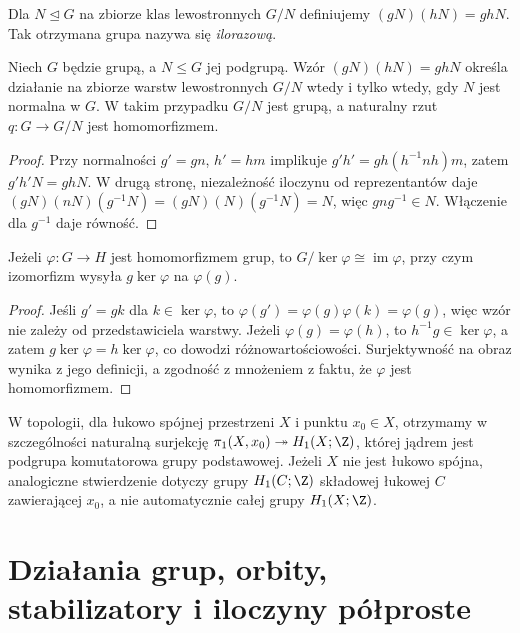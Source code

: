 \begin{definicja}
Dla $N\trianglelefteq G$ na zbiorze klas lewostronnych $G/N$ definiujemy
$(gN)(hN)=ghN$. Tak otrzymana grupa nazywa się \emph{ilorazową}.
\end{definicja}
\begin{lemat}
Niech $G$ będzie grupą, a $N\leq G$ jej podgrupą.
Wzór $(gN)(hN)=ghN$ określa działanie na zbiorze
warstw lewostronnych $G/N$ wtedy i tylko wtedy, gdy
$N$ jest normalna w $G$. W takim przypadku $G/N$
jest grupą, a naturalny rzut $q:G\to G/N$ jest
homomorfizmem.
\end{lemat}
\begin{proof}
Przy normalności $g'=gn$, $h'=hm$ implikuje
$g'h'=gh(h^{-1}nh)m$, zatem $g'h'N=ghN$. W drugą stronę,
niezależność iloczynu od reprezentantów daje
$(gN)(nN)(g^{-1}N)=(gN)(N)(g^{-1}N)=N$,
więc $gng^{-1}\in N$. Włączenie dla $g^{-1}$ daje równość.
\end{proof}
\begin{twierdzenie}
\label{thm:izo-grupy-v5}
Jeżeli $\varphi:G\to H$ jest homomorfizmem grup, to
$G/\ker\varphi\cong\operatorname{im}\varphi$, przy czym izomorfizm
wysyła $g\ker\varphi$ na $\varphi(g)$.
\end{twierdzenie}
\begin{proof}
Jeśli $g'=gk$ dla $k\in\ker\varphi$, to
$\varphi(g')=\varphi(g)\varphi(k)=\varphi(g)$,
więc wzór nie zależy od przedstawiciela warstwy.
Jeżeli $\varphi(g)=\varphi(h)$, to
$h^{-1}g\in\ker\varphi$, a zatem
$g\ker\varphi=h\ker\varphi$, co dowodzi różnowartościowości.
Surjektywność na obraz wynika z jego definicji, a zgodność
z mnożeniem z faktu, że $\varphi$ jest homomorfizmem.
\end{proof}
\begin{uwaga}
W topologii, dla łukowo spójnej przestrzeni $X$ i punktu
$x_0\in X$, otrzymamy w szczególności naturalną surjekcję
$\pi_1(X,x_0)\twoheadrightarrow H_1(X;\Z)$, której jądrem jest
podgrupa komutatorowa grupy podstawowej. Jeżeli $X$ nie jest łukowo
spójna, analogiczne stwierdzenie dotyczy grupy $H_1(C;\Z)$
składowej łukowej $C$ zawierającej $x_0$, a nie automatycznie
całej grupy $H_1(X;\Z)$.
\end{uwaga}

\section{Działania grup, orbity, stabilizatory i iloczyny półproste}

